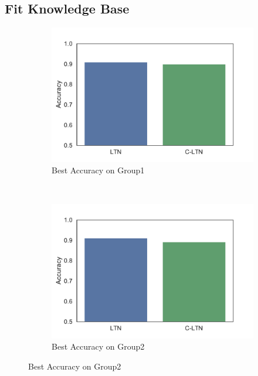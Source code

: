 
\subsection{Fit Knowledge Base}

\begin{figure}[!]
    \centering
    \begin{subfigure}[]{0.24\textwidth}
        \includegraphics[width=\textwidth]{img/bar1.pdf}
        \caption{Best Accuracy on Group1}
        \label{fig:fitting-best-accuracy-1}
    \end{subfigure}~~~~
    \begin{subfigure}[]{0.24\textwidth}
        \includegraphics[width=\textwidth]{img/bar2.pdf}
        \caption{Best Accuracy on Group2}
        \label{fig:fitting-best-accuracy-2}
    \end{subfigure}


\end{figure}
